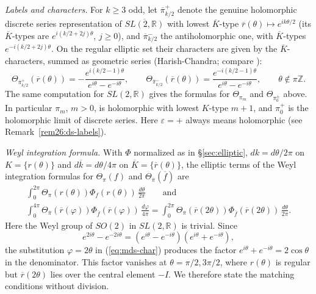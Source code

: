 \documentclass[12pt,letterpaper]{book}
\theoremstyle{plain}
\theoremstyle{definition}
\theoremstyle{remark}
\theoremstyle{remark}
\begin{document}
\emph{Labels and characters.} For $k\geq 3$ odd, let
$\overline{\pi}{}^{+}_{k/2}$ denote the genuine holomorphic discrete series
representation of $\overline{SL(2,{\mathbb R})}$ with lowest
$\overline{K}$-type $\overline{r}(\theta)\mapsto e^{ik\theta/2}$ (its
$\overline K$-types are $e^{i(k/2+2j)\theta}$, $j\geq0$), and
$\overline{\pi}{}^{-}_{k/2}$ the antiholomorphic one, with
$\overline K$-types $e^{-i(k/2+2j)\theta}$. On the regular elliptic set
their characters are given by the $\overline K$-characters, summed as
geometric series (Harish-Chandra; compare \cite{Ad2}):
\begin{equation}\label{eq:mds-char}
\Theta_{\overline{\pi}{}^{+}_{k/2}}(\overline r(\theta))
=-\frac{e^{i(k/2-1)\theta}}{e^{i\theta}-e^{-i\theta}},\qquad
\Theta_{\overline{\pi}{}^{-}_{k/2}}(\overline r(\theta))
=\frac{e^{-i(k/2-1)\theta}}{e^{i\theta}-e^{-i\theta}},\qquad
\theta\notin\pi{\mathbb Z}.
\end{equation}
The same computation for $SL(2,{\mathbb R})$ gives the formulas for
$\Theta_{\pi_m}$ and $\Theta_{\pi_0^\pm}$ above. In particular $\pi_m$,
$m>0$, is holomorphic with lowest $K$-type $m+1$, and $\pi_0^+$ is the
holomorphic limit of discrete series. Here $\varepsilon=+$ always means
holomorphic (see Remark~\ref{rem26:ds-labels}).

\emph{Weyl integration formula.} With $\Phi$ normalized as in
\S\ref{sec:elliptic}, $dk=d\theta/2\pi$ on $K=\{r(\theta)\}$ and
$d\overline k=d\theta/4\pi$ on $\overline K=\{\overline r(\theta)\}$,
the elliptic terms of the Weyl integration formulas for $\Theta_{\pi}(f)$
and $\Theta_{\overline\pi}(\overline f)$ are
\begin{gather*}
\int_0^{2\pi }\Theta _{\pi}(r(\theta ))\Phi_f(r(\theta ))\,\frac{d\theta}{2\pi}
\qquad\text{and}\\
\int_0^{4\pi }
\Theta _{\overline{\pi }}(\overline{r}(\varphi ))
\Phi_{\overline{f}}(\overline{r}(\varphi ))\,\frac{d\varphi}{4\pi}
=\int_0^{2\pi }
\Theta _{\overline{\pi }}(\overline{r}(2\theta ))
\Phi_{\overline{f}}(\overline{r}(2\theta ))\,\frac{d\theta}{2\pi}.
\end{gather*}
Here the Weyl group of $SO(2)$ in $SL(2,{\mathbb R})$ is trivial. Since
\[
e^{2i\theta}-e^{-2i\theta}=(e^{i\theta}-e^{-i\theta})(e^{i\theta}+e^{-i\theta}),
\]
the substitution $\varphi=2\theta$ in (\ref{eq:mds-char}) produces the
factor $e^{i\theta}+e^{-i\theta}=2\cos\theta$ in the denominator. This
factor vanishes at $\theta=\pi/2,3\pi/2$, where $r(\theta)$ is regular
but $\overline r(2\theta)$ lies over the central element $-I$. We
therefore state the matching conditions without division.
\end{document}
